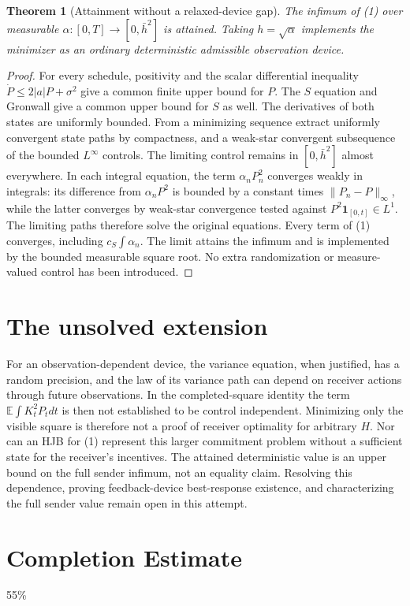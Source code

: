 \documentclass[11pt]{article}
\newtheorem{theorem}{Theorem}
\theoremstyle{definition}
\begin{document}
\begin{theorem}[Attainment without a relaxed-device gap]
The infimum of (1) over measurable $\alpha:[0,T]\to[0,\bar h^2]$
is attained. Taking $h=\sqrt\alpha$ implements the minimizer as an
ordinary deterministic admissible observation device.
\end{theorem}
\begin{proof}
For every schedule, positivity and the scalar differential inequality
$\dot P\le2|a|P+\sigma^2$ give a common finite upper bound for $P$.
The $S$ equation and Gronwall give a common upper bound for $S$ as well.
The derivatives of both states are uniformly bounded. From a minimizing
sequence extract uniformly convergent state paths by compactness, and a
weak-star convergent subsequence of the bounded $L^\infty$ controls.
The limiting control remains in $[0,\bar h^2]$ almost everywhere.
In each integral equation, the term $\alpha_nP_n^2$ converges weakly in
integrals: its difference from $\alpha_nP^2$ is bounded by a constant
times $\|P_n-P\|_\infty$, while the latter converges by weak-star
convergence tested against $P^2\mathbf1_{[0,t]}\in L^1$.
The limiting paths therefore solve the original equations. Every term of
(1) converges, including $c_S\int\alpha_n$. The limit attains the
infimum and is implemented by the bounded measurable square root. No
extra randomization or measure-valued control has been introduced.
\end{proof}

\section*{The unsolved extension}
For an observation-dependent device, the variance equation, when justified,
has a random precision, and the law of its variance path can depend on
receiver actions through future observations. In the completed-square
identity the term $\mathbb E\int K_t^2P_tdt$ is then not established to
be control independent. Minimizing only the visible square is therefore
not a proof of receiver optimality for arbitrary $H$. Nor can an HJB for
(1) represent this larger commitment problem without a sufficient state
for the receiver's incentives. The attained deterministic value is an
upper bound on the full sender infimum, not an equality claim. Resolving
this dependence, proving feedback-device best-response existence, and
characterizing the full sender value remain open in this attempt.

\section{Completion Estimate}
55\%
\end{document}
